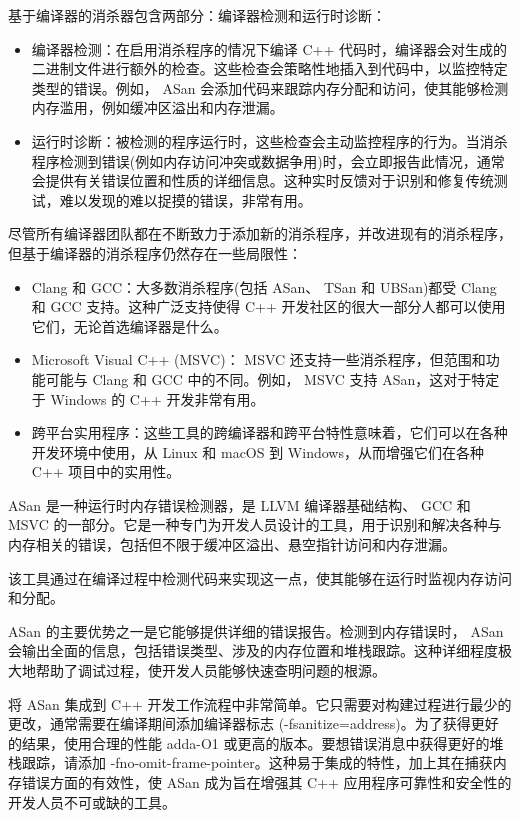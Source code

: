 基于编译器的消杀器包含两部分：编译器检测和运行时诊断：

\begin{itemize}
\item
编译器检测：在启用消杀程序的情况下编译 C++ 代码时，编译器会对生成的二进制文件进行额外的检查。这些检查会策略性地插入到代码中，以监控特定类型的错误。例如， ASan 会添加代码来跟踪内存分配和访问，使其能够检测内存滥用，例如缓冲区溢出和内存泄漏。

\item
运行时诊断：被检测的程序运行时，这些检查会主动监控程序的行为。当消杀程序检测到错误(例如内存访问冲突或数据争用)时，会立即报告此情况，通常会提供有关错误位置和性质的详细信息。这种实时反馈对于识别和修复传统测试，难以发现的难以捉摸的错误，非常有用。
\end{itemize}

尽管所有编译器团队都在不断致力于添加新的消杀程序，并改进现有的消杀程序，但基于编译器的消杀程序仍然存在一些局限性：

\begin{itemize}
\item
Clang 和 GCC：大多数消杀程序(包括 ASan、 TSan 和 UBSan)都受 Clang 和 GCC 支持。这种广泛支持使得 C++ 开发社区的很大一部分人都可以使用它们，无论首选编译器是什么。

\item
Microsoft Visual C++ (MSVC)： MSVC 还支持一些消杀程序，但范围和功能可能与 Clang 和 GCC 中的不同。例如， MSVC 支持 ASan，这对于特定于 Windows 的 C++ 开发非常有用。

\item
跨平台实用程序：这些工具的跨编译器和跨平台特性意味着，它们可以在各种开发环境中使用，从 Linux 和 macOS 到 Windows，从而增强它们在各种 C++ 项目中的实用性。
\end{itemize}


ASan 是一种运行时内存错误检测器，是 LLVM 编译器基础结构、 GCC 和 MSVC 的一部分。它是一种专门为开发人员设计的工具，用于识别和解决各种与内存相关的错误，包括但不限于缓冲区溢出、悬空指针访问和内存泄漏。

该工具通过在编译过程中检测代码来实现这一点，使其能够在运行时监视内存访问和分配。

ASan 的主要优势之一是它能够提供详细的错误报告。检测到内存错误时， ASan 会输出全面的信息，包括错误类型、涉及的内存位置和堆栈跟踪。这种详细程度极大地帮助了调试过程，使开发人员能够快速查明问题的根源。

将 ASan 集成到 C++ 开发工作流程中非常简单。它只需要对构建过程进行最少的更改，通常需要在编译期间添加编译器标志 (-fsanitize=address)。为了获得更好的结果，使用合理的性能 adda-O1 或更高的版本。要想错误消息中获得更好的堆栈跟踪，请添加 -fno-omit-frame-pointer。这种易于集成的特性，加上其在捕获内存错误方面的有效性，使 ASan 成为旨在增强其 C++ 应用程序可靠性和安全性的开发人员不可或缺的工具。

